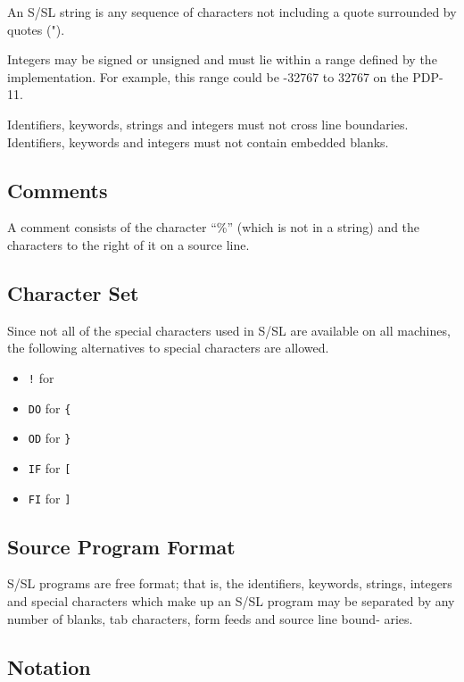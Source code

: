 An S/SL string is any sequence of characters not  
including a quote surrounded by quotes (").

Integers  may be signed or unsigned and must lie within a
range defined by  the  implementation.   For  example,  this
range could be -32767 to 32767 on the PDP-11.

Identifiers, keywords,  strings  and  integers  must not
cross line boundaries.  Identifiers, keywords  and  integers
must not contain embedded blanks.




\subsection{Comments}

A  comment consists of the character ``\%'' (which is not in
a string) and the characters to the right of it on a  source
line.




\subsection{Character Set}

Since  not all of the special characters used in S/SL are
available on all machines,  the  following  alternatives  to
special characters are allowed.
\begin{itemize}
\item {\tt !} for {\tt {\verbar}}
\item {\tt DO} for {\tt \{}
\item {\tt OD} for {\tt \}}
\item {\tt IF} for {\tt [}
\item {\tt FI} for {\tt ]}
\end{itemize}





\subsection{Source Program Format}

S/SL programs are free format; that is, the identifiers,
keywords, strings, integers  and  special  characters  which
make  up  an  S/SL program may be separated by any number of
blanks, tab characters, form feeds and  source  line  bound-
aries.




\subsection{Notation}


